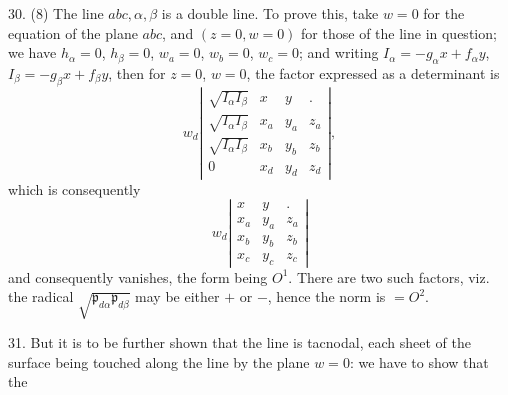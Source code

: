 \documentclass[11pt,a4paper]{article}
\newcommand{\Det}[1]{\left|\begin{matrix}#1\end{matrix}\right|}
\newcommand{\p}{\mathfrak p}
\begin{document}
30. (8) The line $abc,\alpha,\beta$ is a double line. To prove this, take $w=0$
for the equation of the plane $abc$, and $(z=0,w=0)$ for those of the line in
question; we have $h_\alpha=0$, $h_\beta=0$, $w_a=0$, $w_b=0$, $w_c=0$; and
writing $I_\alpha=-g_\alpha x+f_\alpha y$, $I_\beta=-g_\beta x+f_\beta y$, then
for $z=0$, $w=0$, the factor expressed as a determinant is
\[
w_d\Det{
\sqrt{I_\alpha I_\beta}&x&y&.\\
\sqrt{I_\alpha I_\beta}&x_a&y_a&z_a\\
\sqrt{I_\alpha I_\beta}&x_b&y_b&z_b\\
0&x_d&y_d&z_d},
\]
which is consequently
\[
w_d\Det{
x&y&.\\
x_a&y_a&z_a\\
x_b&y_b&z_b\\
x_c&y_c&z_c}
\]
and consequently vanishes, the form being $O^1$. There are two such factors, viz.
the radical $\sqrt{\p_{d\alpha}\p_{d\beta}}$ may be either $+$ or $-$, hence the
norm is $=O^2$.

31. But it is to be further shown that the line is tacnodal, each sheet of the surface
being touched along the line by the plane $w=0$: we have to show that the
\end{document}
